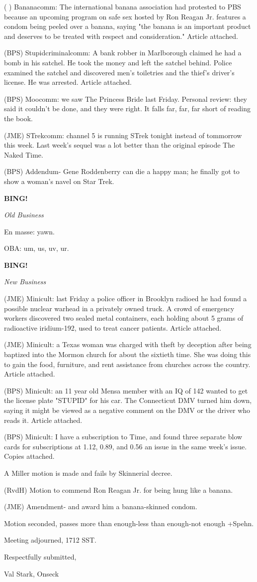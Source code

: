 \documentclass[12pt]{article}
\newcommand{\bing}{{\bf BING!} }
\newcommand{\goto}[1]{\bing \vskip 12pt \centerline{{\em{#1}}}}
\begin{document}
( ) Bananacomm: The international banana association had protested to PBS because an upcoming program on safe sex hosted by Ron Reagan Jr. features a condom being peeled over a banana, saying "the banana is an important product and deserves to be treated with respect and consideration." Article attached.

(BPS) Stupidcriminalcomm: A bank robber in Marlborough claimed he had a bomb in his satchel. He took the money and left the satchel behind. Police examined the satchel and discovered men's toiletries and the thief's driver's license. He was arrested. Article attached.

(BPS) Moocomm: we saw The Princess Bride last Friday. Personal review: they said it couldn't be done, and they were right. It falls far, far, far short of reading the book.

(JME) STrekcomm: channel 5 is running STrek tonight instead of tommorrow this week. Last week's sequel was a lot better than the original episode The Naked Time.

(BPS) Addendum- Gene Roddenberry can die a happy man; he finally got to show a woman's navel on Star Trek.

\goto{Old Business}

En masse: yawn.

OBA: um, us, uv, ur.

\goto{New Business}

(JME) Minicult: last Friday a police officer in Brooklyn radioed he had found a possible nuclear warhead in a privately owned truck. A crowd of emergency workers discovered two sealed metal containers, each holding about 5 grams of radioactive iridium-192, used to treat cancer patients. Article attached.

(JME) Minicult: a Texas woman was charged with theft by deception after being baptized into the Mormon church for about the sixtieth time. She was doing this to gain the food, furniture, and rent assistance from churches across the country. Article attached.

(BPS) Minicult: an 11 year old Mensa member with an IQ of 142 wanted to get the license plate "STUPID" for his car. The Connecticut DMV turned him down, saying it might be viewed as a negative comment on the DMV or the driver who reads it. Article attached.

(BPS) Minicult: I have a subscription to Time, and found three separate blow cards for subscriptions at 1.12, 0.89, and 0.56 an issue in the same week's issue. Copies attached.

A Miller motion is made and fails by Skinnerial decree.

(RvdH) Motion to commend Ron Reagan Jr. for being hung like a banana.

(JME) Amendment- and award him a banana-skinned condom.

Motion seconded, passes more than enough-less than enough-not enough +Spehn.

\vspace{12pt}

\noindent
Meeting adjourned, 1712 SST.

\vspace{18pt}

\centerline{Respectfully submitted,}
\centerline{Val Stark, Onseck}
\end{document}
